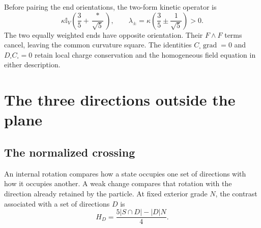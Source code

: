 \documentclass[aps,prx,onecolumn,10pt,notitlepage,nofootinbib,longbibliography]{revtex4-2}
\numberwithin{equation}{section}
\numberwithin{table}{section}
\newcommand{\Id}{\mathbb I}
\begin{document}
Before pairing the end orientations, the two-form kinetic operator is
\begin{equation}
 \kappa\Id_V\left(\frac35+\frac{*}{\sqrt5}\right),\qquad
 \lambda_\pm=\kappa\left(\frac35\pm\frac1{\sqrt5}\right)>0.
 \label{eq:orientedtwoform}
\end{equation}
The two equally weighted ends have opposite orientation. Their
$F\wedge F$ terms cancel, leaving the common curvature square. The
identities $C_\square\operatorname{grad}=0$ and
$D_\square C_\square=0$ retain local charge conservation and the
homogeneous field equation in either description.

\section{The three directions outside the plane}
\label{sec:step-six}

\subsection{The normalized crossing}
An internal rotation compares how a state occupies one set of directions with how it occupies another. A weak change compares that rotation with the direction already retained by the particle. At fixed exterior grade $N$, the contrast associated with a set of directions $D$ is
\begin{equation}
 H_D=\frac{5|S\cap D|-|D|N}{4}.
\end{equation}
\end{document}
